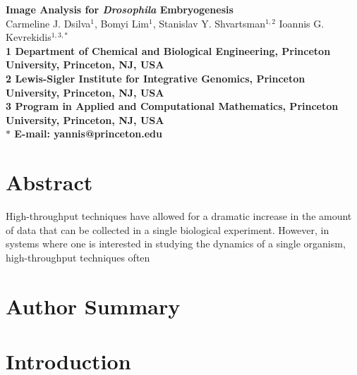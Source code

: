 \documentclass[10pt]{article}
\date{}
\begin{document}
\begin{flushleft}
{\Large
\textbf{Image Analysis for {\em Drosophila} Embryogenesis}
}
\\
Carmeline J. Dsilva$^{1}$,
Bomyi Lim$^{1}$,
Stanislav Y. Shvartsman$^{1,2}$
Ioannis G. Kevrekidis$^{1,3,\ast}$
\\
\bf{1} Department of Chemical and Biological Engineering, Princeton University, Princeton, NJ, USA
\\
\bf{2} Lewis-Sigler Institute for Integrative Genomics, Princeton University, Princeton, NJ, USA
\\
\bf{3} Program in Applied and Computational Mathematics, Princeton University, Princeton, NJ, USA
\\
$\ast$ E-mail: yannis@princeton.edu
\end{flushleft}

\section*{Abstract}

High-throughput techniques have allowed for a dramatic increase in the amount of data that can be collected in a single biological experiment.
%
However, in systems where one is interested in studying the dynamics of a single organism, high-throughput techniques often 

\section*{Author Summary}

\section*{Introduction}
\end{document}
